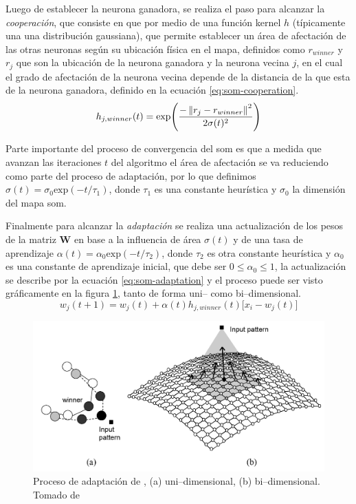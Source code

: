 Luego de establecer la neurona ganadora, se realiza el paso para alcanzar la \emph{cooperación}, que consiste en que por medio de una función kernel $h$ (típicamente una una distribución gaussiana), que permite establecer un área de afectación de las otras neuronas según su ubicación física en el mapa, definidos como $r_{winner}$ y $r_j$ que son la ubicación de la neurona ganadora y la neurona vecina $j$, en el cual el grado de afectación de la neurona vecina depende de la distancia de la que esta de la neurona ganadora, definido en la ecuación \ref{eq:som-cooperation}.
\begin{equation} \label{eq:som-cooperation}
  h_{j, winner}(t) = \text{exp}\Bigg(\frac{- \left\lVert r_j - r_{winner}\right\rVert^2}{ 2 \sigma(t)^2}\Bigg)
\end{equation}

Parte importante del proceso de convergencia del \gls{som} es que a medida que avanzan las iteraciones $t$ del algoritmo el área de afectación se va reduciendo como parte del proceso de adaptación, por lo que definimos $\sigma(t) = \sigma_0 \text{exp}(-t / \tau_1)$, donde $\tau_1$ es una constante heurística y $\sigma_0$ la dimensión del mapa \gls{som}.

Finalmente para alcanzar la \emph{adaptación} se realiza una actualización de los pesos de la matriz $\mathbf{W}$ en base a la influencia de área $\sigma(t)$ y de una tasa de aprendizaje $\alpha(t) = \alpha_0 \text{exp}(-t/ \tau_2)$, donde $\tau_2$ es otra constante heurística y $\alpha_0$ es una constante de aprendizaje inicial, que debe ser $0 \le \alpha_0 \le 1$, la actualización se describe por la ecuación \ref{eq:som-adaptation} y el proceso puede ser visto gráficamente en la figura \ref{fig:som-adap-proc}, tanto de forma uni-- como bi--dimensional.
\begin{equation} \label{eq:som-adaptation}
  w_j(t+1) = w_j(t) + \alpha(t) h_{j, winner}(t)\Big[x_i-w_j(t)\Big]
\end{equation}

\begin{figure}[th]
\centering
\includegraphics[scale=0.2]{Figures/som-adaptive-proc.png}
\decoRule
\caption[Proceso de adaptación de ]{Proceso de adaptación de , (a) uni--dimensional, (b) bi--dimensional. Tomado de \cite{de2006fundamentals}}
\label{fig:som-adap-proc}
\end{figure}

